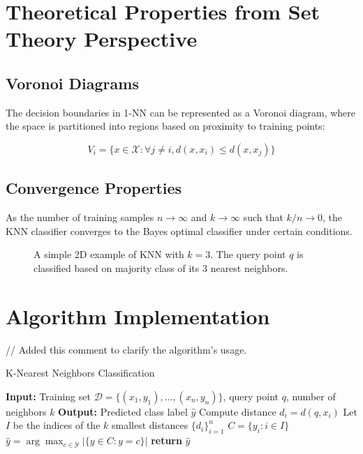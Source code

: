 \documentclass[12pt,a4paper]{article}
\begin{document}
\section{Theoretical Properties from Set Theory Perspective}

\subsection{Voronoi Diagrams}
The decision boundaries in 1-NN can be represented as a Voronoi diagram, where the space is partitioned into regions based on proximity to training points:

\begin{equation}
V_i = \{x \in \mathcal{X} : \forall j \neq i, d(x, x_i) \leq d(x, x_j)\}
\end{equation}

\subsection{Convergence Properties}
As the number of training samples $n \rightarrow \infty$ and $k \rightarrow \infty$ such that $k/n \rightarrow 0$, the KNN classifier converges to the Bayes optimal classifier under certain conditions.

\begin{figure}[H]
\centering
{}
\caption{A simple 2D example of KNN with $k=3$. The query point $q$ is classified based on majority class of its 3 nearest neighbors.}
\label{fig:knn_example}
\end{figure}

\section{Algorithm Implementation}
// Added this comment to clarify the algorithm's usage.
\begin{algorithm}
\caption{K-Nearest Neighbors Classification}
\begin{algorithmic}[1]
\State \textbf{Input:} Training set $\mathcal{D} = \{(x_1, y_1), \ldots, (x_n, y_n)\}$, query point $q$, number of neighbors $k$
\State \textbf{Output:} Predicted class label $\hat{y}$
    \State Compute distance $d_i = d(q, x_i)$
\EndFor
\State Let $I$ be the indices of the $k$ smallest distances $\{d_i\}_{i=1}^n$
\State $C = \{y_i : i \in I\}$ 
\State $\hat{y} = \arg\max_{c \in \mathcal{Y}} |\{y \in C : y = c\}|$ 
\State \textbf{return} $\hat{y}$
\end{algorithmic}
\end{algorithm}
\end{document}
